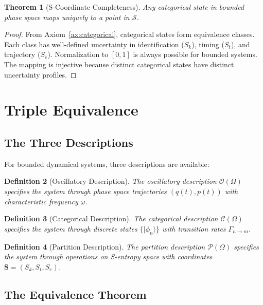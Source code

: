 \documentclass[aps,prd,twocolumn,superscriptaddress,floatfix,nofootinbib]{revtex4-2}
\newtheorem{theorem}{Theorem}[section]
\newtheorem{definition}[theorem]{Definition}
\theoremstyle{remark}
\newcommand{\Sk}{S_k}
\newcommand{\St}{S_t}
\newcommand{\Se}{S_e}
\newcommand{\Sspace}{\mathcal{S}}
\newcommand{\Scoord}{\mathbf{S}}
\newcommand{\Pcat}{\mathcal{P}}
\newcommand{\Ocat}{\mathcal{O}}
\newcommand{\Ccat}{\mathcal{C}}
\begin{document}
\begin{theorem}[S-Coordinate Completeness]
\label{thm:s_complete}
Any categorical state in bounded phase space maps uniquely to a point in $\Sspace$.
\end{theorem}

\begin{proof}
From Axiom~\ref{ax:categorical}, categorical states form equivalence classes. Each class has well-defined uncertainty in identification ($\Sk$), timing ($\St$), and trajectory ($\Se$). Normalization to $[0,1]$ is always possible for bounded systems. The mapping is injective because distinct categorical states have distinct uncertainty profiles.
\end{proof}

\section{Triple Equivalence}
\label{sec:triple}

\subsection{The Three Descriptions}

For bounded dynamical systems, three descriptions are available:

\begin{definition}[Oscillatory Description]
\label{def:oscillatory}
The oscillatory description $\Ocat(\Omega)$ specifies the system through phase space trajectories $(q(t), p(t))$ with characteristic frequency $\omega$.
\end{definition}

\begin{definition}[Categorical Description]
\label{def:categorical}
The categorical description $\Ccat(\Omega)$ specifies the system through discrete states $\{|\phi_n\rangle\}$ with transition rates $\Gamma_{n \to m}$.
\end{definition}

\begin{definition}[Partition Description]
\label{def:partition}
The partition description $\Pcat(\Omega)$ specifies the system through operations on S-entropy space with coordinates $\Scoord = (\Sk, \St, \Se)$.
\end{definition}

\subsection{The Equivalence Theorem}
\end{document}
